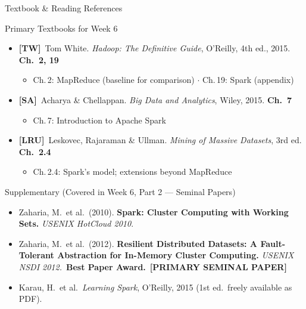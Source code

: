 \documentclass[aspectratio=169,10pt]{beamer}
\begin{document}
\begin{frame}{Textbook \& Reading References}
  \begin{block}{Primary Textbooks for Week 6}
    \begin{itemize}
      \item \textbf{[TW]}\ Tom White. \textit{Hadoop: The Definitive Guide}, O'Reilly, 4th ed., 2015.
            \hfill \textbf{Ch.\ 2, 19}
            \begin{itemize}
              \small\item Ch.\,2: MapReduce (baseline for comparison) $\cdot$ Ch.\,19: Spark (appendix)
            \end{itemize}
      \item \textbf{[SA]}\ Acharya \& Chellappan. \textit{Big Data and Analytics}, Wiley, 2015.
            \hfill \textbf{Ch.\ 7}
            \begin{itemize}
              \small\item Ch.\,7: Introduction to Apache Spark
            \end{itemize}
      \item \textbf{[LRU]}\ Leskovec, Rajaraman \& Ullman. \textit{Mining of Massive Datasets}, 3rd ed.
            \hfill \textbf{Ch.\ 2.4}
            \begin{itemize}
              \small\item Ch.\,2.4: Spark's model; extensions beyond MapReduce
            \end{itemize}
    \end{itemize}
  \end{block}
  \vspace{6pt}
  \begin{exampleblock}{Supplementary (Covered in Week 6, Part 2 --- Seminal Papers)}
    \begin{itemize}
      \small
      \item Zaharia, M.\ et al.\ (2010). \textbf{Spark: Cluster Computing with Working Sets.}
            \textit{USENIX HotCloud 2010}.
      \item Zaharia, M.\ et al.\ (2012). \textbf{Resilient Distributed Datasets: A Fault-Tolerant Abstraction for In-Memory Cluster Computing.}
            \textit{USENIX NSDI 2012.}\ \textbf{Best Paper Award.}\ \textbf{[PRIMARY SEMINAL PAPER]}
      \item Karau, H.\ et al.\ \textit{Learning Spark}, O'Reilly, 2015 (1st ed.\ freely available as PDF).
    \end{itemize}
  \end{exampleblock}
\end{frame}
\end{document}
